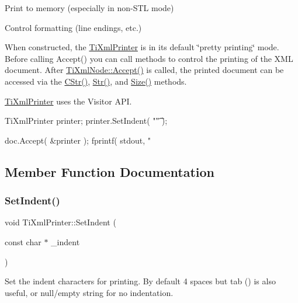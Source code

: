 \begin{DoxyEnumerate}
\item Print to memory (especially in non-\/\+S\+TL mode)
\item Control formatting (line endings, etc.)
\end{DoxyEnumerate}

When constructed, the \hyperlink{class_ti_xml_printer}{Ti\+Xml\+Printer} is in its default \char`\"{}pretty printing\char`\"{} mode. Before calling Accept() you can call methods to control the printing of the X\+ML document. After \hyperlink{class_ti_xml_node_acc0f88b7462c6cb73809d410a4f5bb86}{Ti\+Xml\+Node\+::\+Accept()} is called, the printed document can be accessed via the \hyperlink{class_ti_xml_printer_a859eede9597d3e0355b77757be48735e}{C\+Str()}, \hyperlink{class_ti_xml_printer_a3bd4daf44309b41f5813a833caa0d1c9}{Str()}, and \hyperlink{class_ti_xml_printer_ad01375ae9199bd2f48252eaddce3039d}{Size()} methods.

\hyperlink{class_ti_xml_printer}{Ti\+Xml\+Printer} uses the Visitor A\+PI. \begin{DoxyVerb}TiXmlPrinter printer;
printer.SetIndent( "\t" );

doc.Accept( &printer );
fprintf( stdout, "%
\end{DoxyVerb}
 

\subsection{Member Function Documentation}
\mbox{\label{class_ti_xml_printer_a213377a4070c7e625bae59716b089e5e}} 
\subsubsection{\texorpdfstring{Set\+Indent()}{SetIndent()}}
{\footnotesize\ttfamily void Ti\+Xml\+Printer\+::\+Set\+Indent (\begin{DoxyParamCaption}\item[{const char $\ast$}]{\+\_\+indent }\end{DoxyParamCaption})\hspace{0.3cm}{\ttfamily [inline]}}

Set the indent characters for printing. By default 4 spaces but tab () is also useful, or null/empty string for no indentation. \mbox{\label{class_ti_xml_printer_a4be1e37e69e3858c59635aa947174fe6}} 
